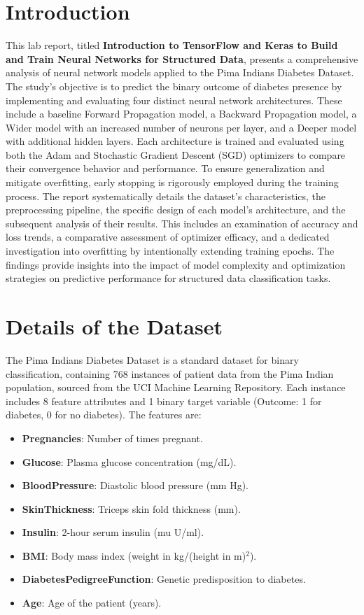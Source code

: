 \documentclass[a4paper,12pt]{article}
\begin{document}
\section*{Introduction}
This lab report, titled \textbf{Introduction to TensorFlow and Keras to Build and Train Neural Networks for Structured Data}, presents a comprehensive analysis of neural network models applied to the Pima Indians Diabetes Dataset. The study's objective is to predict the binary outcome of diabetes presence by implementing and evaluating four distinct neural network architectures. These include a baseline Forward Propagation model, a Backward Propagation model, a Wider model with an increased number of neurons per layer, and a Deeper model with additional hidden layers. Each architecture is trained and evaluated using both the Adam and Stochastic Gradient Descent (SGD) optimizers to compare their convergence behavior and performance. To ensure generalization and mitigate overfitting, early stopping is rigorously employed during the training process. The report systematically details the dataset's characteristics, the preprocessing pipeline, the specific design of each model's architecture, and the subsequent analysis of their results. This includes an examination of accuracy and loss trends, a comparative assessment of optimizer efficacy, and a dedicated investigation into overfitting by intentionally extending training epochs. The findings provide insights into the impact of model complexity and optimization strategies on predictive performance for structured data classification tasks.


\section*{Details of the Dataset}
The Pima Indians Diabetes Dataset is a standard dataset for binary classification, containing 768 instances of patient data from the Pima Indian population, sourced from the UCI Machine Learning Repository. Each instance includes 8 feature attributes and 1 binary target variable (Outcome: 1 for diabetes, 0 for no diabetes). The features are:

\begin{itemize}
    \item \textbf{Pregnancies}: Number of times pregnant.
    \item \textbf{Glucose}: Plasma glucose concentration (mg/dL).
    \item \textbf{BloodPressure}: Diastolic blood pressure (mm Hg).
    \item \textbf{SkinThickness}: Triceps skin fold thickness (mm).
    \item \textbf{Insulin}: 2-hour serum insulin (mu U/ml).
    \item \textbf{BMI}: Body mass index (weight in kg/(height in m)$^2$).
    \item \textbf{DiabetesPedigreeFunction}: Genetic predisposition to diabetes.
    \item \textbf{Age}: Age of the patient (years).
\end{itemize}
\end{document}
